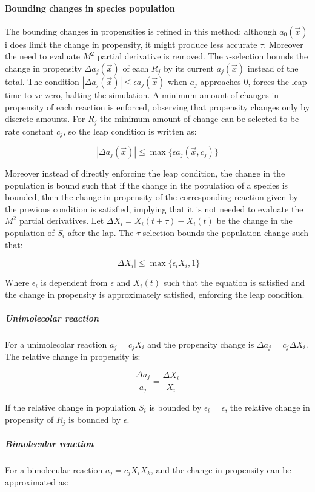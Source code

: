       \paragraph{Bounding changes in species population}
      The bounding changes in propensities is refined in this method: although $a_0(\vec{x})$ i does limit the change in propensity, it might produce less accurate $\tau$.
      Moreover the need to evaluate $M^2$ partial derivative is removed.
      The $\tau$-selection bounds the change in propensity $\Delta a_j(\vec{x})$ of each $R_j$ by its current $a_j(\vec{x})$ instead of the total.
      The condition $|\Delta a_j(\vec{x})|\le \epsilon a_j(\vec{x})$ when $a_j$ approaches $0$, forces the leap time to ve zero, halting the simulation.
      A minimum amount of changes in propensity of each reaction is enforced, observing that propensity changes only by discrete amounts.
      For $R_j$ the minimum amount of change can be selected to be rate constant $c_j$, so the leap condition is written as:

      $$|\Delta a_j(\vec{x})|\le\max\{\epsilon a_j(\vec{x}, c_j)\}$$

      Moreover instead of directly enforcing the leap condition, the change in the population is bound such that if the change in the population of a species is bounded, then the change in propensity of the corresponding reaction given by the previous condition is satisfied, implying that it is not needed to evaluate the $M^2$ partial derivatives.
      Let $\Delta X_i = X_i(t+\tau)-X_i(t)$ be the change in the population of $S_i$ after the lap.
      The $\tau$ selection bounds the population change such that:

      $$|\Delta X_i|\le \max\{\epsilon_i X_i, 1\}$$

      Where $\epsilon_i$ is dependent from $\epsilon$ and $X_i(t)$ such that the equation is satisfied and the change in propensity is approximately satisfied, enforcing the leap condition.
        \subparagraph{Unimolecolar reaction}
        For a unimolecolar reaction $a_j = c_jX_i$ and the propensity change is $\Delta a_j = c_j\Delta X_i$.
        The relative change in propensity is:

        $$\frac{\Delta a_j}{a_j} = \frac{\Delta X_i}{X_i}$$

        If the relative change in population $S_i$ is bounded by $\epsilon_i = \epsilon$, the relative change in propensity of $R_j$ is bounded by $\epsilon$.

        \subparagraph{Bimolecular reaction}
        For a bimolecular reaction $a_j = c_jX_iX_k$, and the change in propensity can be approximated as:

